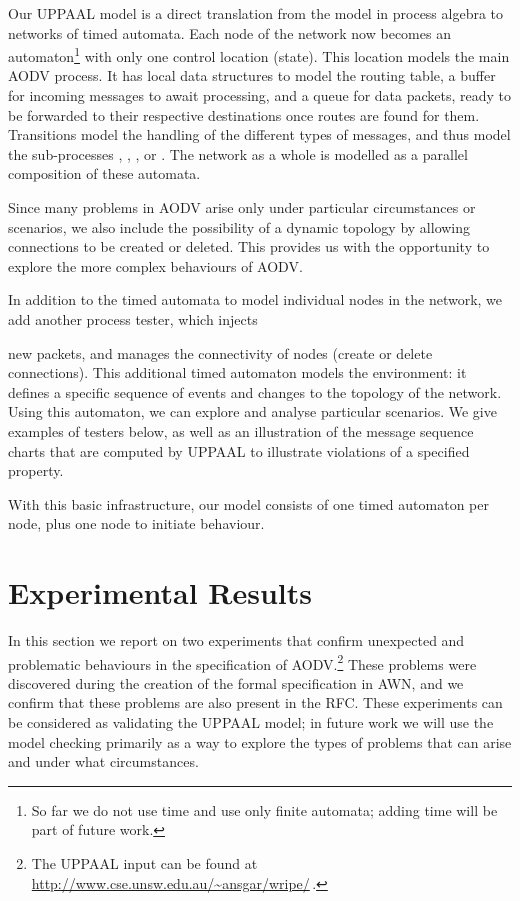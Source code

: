 \documentclass[conference,twoside]{IEEEtran}
\newcommand{\tester}{{\small\sf tester}\xspace}
\newcommand{\testers}{{\small\sf testers}\xspace}
\newcommand{\awn}{AWN\xspace}
\begin{document}
Our UPPAAL model is a  direct translation from the model in process algebra to networks of timed automata.
Each node of the network now becomes an automaton\footnote{So far we do not use time and use only finite automata; adding time will be part of future work.} with only one control location (state). This location models the main AODV process. It has local data structures to model the routing table, a buffer for incoming messages to await processing, and a queue for data packets, ready to be forwarded to their respective destinations once routes are found for them. Transitions model the handling of the different types of messages, and thus model the sub-processes {\PKT}, {\RREQ}, {\RREP}, or {\RERR}.
The network as a whole is modelled as a parallel composition of these automata.


Since many problems in AODV arise only under particular circumstances or scenarios,
we also include the possibility of a dynamic topology by allowing connections to be created or deleted. This provides us with the opportunity to explore the more complex behaviours of AODV.

In addition to the timed automata to model individual nodes in the network, we add another process {\tester}, which injects\linebreak\mbox{}

\mbox{}
\vspace*{-36pt}

\noindent
new packets, and manages the connectivity of nodes (create or
delete connections). This additional timed automaton models the environment:
it defines a specific sequence of events and changes to the topology of the network. Using this automaton, we can explore and
analyse particular scenarios. We give examples of \testers below, as well as an illustration of the message sequence charts that are computed by UPPAAL to illustrate violations of a specified property.

With this basic infrastructure, our model consists of one timed automaton per node, plus one node to initiate behaviour.

\section{Experimental Results}
\label{sec:experiments}


In this section we report on two experiments that confirm unexpected and problematic behaviours in the specification of
AODV\@.\footnote{The UPPAAL input can be found at \url{http://www.cse.unsw.edu.au/~ansgar/wripe/}\,.} These problems were discovered during the creation of the  formal
specification in \awn, and we confirm that these problems are also present in the RFC\@.
These ex\-peri\-ments can be considered as validating the UPPAAL model;  in future work we will use
the model checking primarily as a way to explore the types of problems that can arise and under what circumstances.
\end{document}
